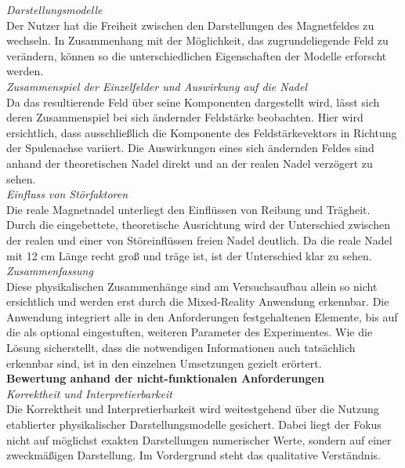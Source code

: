 \textit{Darstellungsmodelle}\\
Der Nutzer hat die Freiheit zwischen den Darstellungen des Magnetfeldes zu wechseln. In Zusammenhang mit der Möglichkeit, das zugrundeliegende Feld zu verändern, können so die unterschiedlichen Eigenschaften der Modelle erforscht werden.\\

\textit{Zusammenspiel der Einzelfelder und Auswirkung auf die Nadel}\\
Da das resultierende Feld über seine Komponenten dargestellt wird, lässt sich deren Zusammenspiel bei sich ändernder Feldstärke beobachten. Hier wird ersichtlich, dass ausschließlich die Komponente des Feldstärkevektors in Richtung der Spulenachse variiert. Die Auswirkungen eines sich ändernden Feldes sind anhand der theoretischen Nadel direkt und an der realen Nadel verzögert zu sehen.\\


\textit{Einfluss von Störfaktoren}\\
Die reale Magnetnadel unterliegt den Einflüssen von Reibung und Trägheit. Durch die eingebettete, theoretische Ausrichtung wird der Unterschied zwischen der realen und einer von Störeinflüssen freien Nadel deutlich. Da die reale Nadel mit 12 cm Länge recht groß und träge ist, ist der Unterschied klar zu sehen.\\

\textit{Zusammenfassung}\\
Diese physikalischen Zusammenhänge sind am Versuchsaufbau allein so nicht ersichtlich und werden erst durch die Mixed-Reality Anwendung erkennbar. Die Anwendung integriert alle in den Anforderungen festgehaltenen Elemente, bis auf die als optional eingestuften, weiteren Parameter des Experimentes. Wie die Lösung sicherstellt, dass die notwendigen Informationen auch tatsächlich erkennbar sind, ist in den einzelnen Umsetzungen gezielt erörtert.\\

\textbf{Bewertung anhand der nicht-funktionalen Anforderungen}\\
\textit{Korrektheit und Interpretierbarkeit}\\
Die Korrektheit und Interpretierbarkeit wird weitestgehend über die Nutzung etablierter physikalischer Darstellungsmodelle gesichert. Dabei liegt der Fokus nicht auf möglichst exakten Darstellungen numerischer Werte, sondern auf einer zweckmäßigen Darstellung. Im Vordergrund steht das qualitative Verständnis.\\

